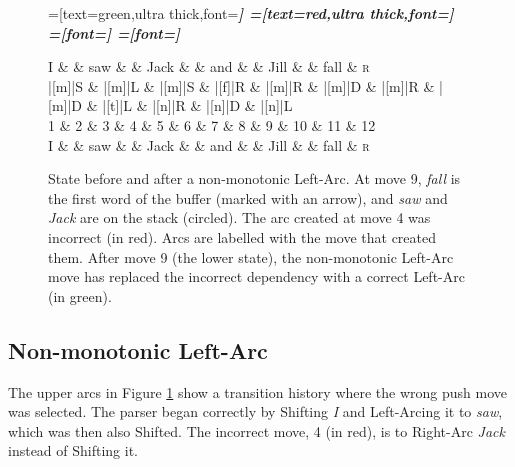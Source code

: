 \documentclass[11pt,letterpaper]{article}
\begin{document}
\begin{figure}
    \centering
    \begin{dependency}[theme=simple]
        =[text=green,ultra thick,font=\bfseries\itshape]
        =[text=red,ultra thick,font=\bfseries\itshape]
        =[font=\bfseries\itshape]
        =[font=\itshape]

        \begin{deptext}[column sep=.075cm, row sep=.1ex]
            I \&           \& saw \&          \& Jack       \& \& and     \&           \& Jill   \&  \& fall \& \textsc{r} \\
|[m]|S \& |[m]|L \& |[m]|S   \& |[f]|R \& |[m]|R \& |[m]|D \& |[m]|R \& |[m]|D \& |[t]|L \& |[n]|R \& |[n]|D \& |[n]|L \\
            1 \&     2       \& 3  \&   4      \& 5          \& 6 \& 7     \& 8 \& 9 \& 10 \& 11 \& 12 \\
    I \&           \& saw \&          \& Jack       \& \& and     \&           \& Jill   \&      \& fall \& \textsc{r} \\
        \end{deptext}
    
    
\end{dependency}
\caption{
    \small
    State before and after a non-monotonic Left-Arc.
    At move 9, \emph{fall} is the first word of the buffer (marked with an arrow),
    and \emph{saw} and \emph{Jack} are on the stack (circled). The arc created at move 4 was
    incorrect (in red). Arcs are labelled with the move that created them.
    After move 9 (the lower state), the non-monotonic Left-Arc move
    has replaced the incorrect dependency with a correct Left-Arc (in green).
\label{fig:clobber}}
\end{figure}


\subsection{Non-monotonic Left-Arc}

The upper arcs in Figure \ref{fig:clobber} show a transition history where the wrong
push move was selected. The parser began correctly by Shifting \emph{I}
and Left-Arcing it to \emph{saw}, which was then also Shifted. The incorrect move,
4 (in red), is to Right-Arc \emph{Jack} instead of Shifting it.
\end{document}
